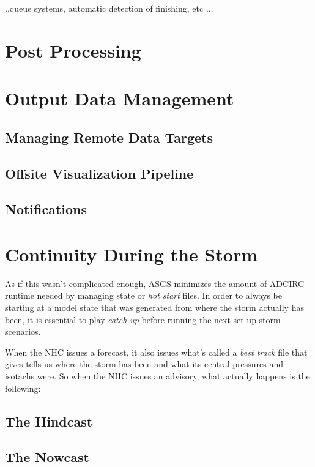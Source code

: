 \documentclass{article}
\begin{document}
..queue systems, automatic detection of finishing, etc ...

\section{Post Processing}

\section{Output Data Management}

\subsection{Managing Remote Data Targets}

\subsection{Offsite Visualization Pipeline}

\subsection{Notifications}

\section{Continuity During the Storm}

As if this wasn't complicated enough, ASGS minimizes the amount of ADCIRC runtime needed
by managing state or \textit{hot start} files. In order to always be starting at a model
state that was generated from where the storm actually has been, it is essential to play
\textit{catch up} before running the next set up storm scenarios.

When the NHC issues a forecast, it also issues what's called a \textit{best track} file
that gives tells us where the storm has been and what its central pressures and isotachs
were. So when the NHC issues an advisory, what actually happens is the following:

\subsection{The Hindcast}

\subsection{The Nowcast}
\end{document}
